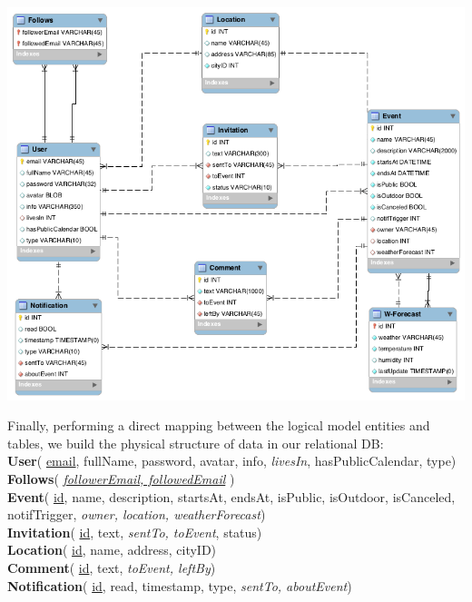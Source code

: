 \documentclass[12pt]{book}
\begin{document}
\begin{center}
\includegraphics[scale=0.58]{logicalModel}\\
\end{center}
Finally, performing a direct mapping between the logical model entities and tables, we build the physical structure of data in our relational DB:\\

\textbf{User}( \underline{email}, fullName, password, avatar, info, \textit{livesIn}, hasPublicCalendar, type)\\

\textbf{Follows}( \underline{\textit{followerEmail, followedEmail}} )\\

\textbf{Event}( \underline{id}, name, description, startsAt, endsAt, isPublic, isOutdoor, isCanceled, notifTrigger, \textit{owner, location, weatherForecast})\\

\textbf{Invitation}( \underline{id}, text, \textit{sentTo, toEvent}, status)\\

\textbf{Location}( \underline{id}, name, address, cityID)\\

\textbf{Comment}( \underline{id}, text, \textit{toEvent, leftBy})\\

\textbf{Notification}( \underline{id}, read, timestamp, type, \textit{sentTo, aboutEvent})\\
\end{document}
